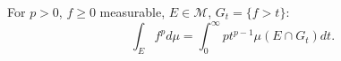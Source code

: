 For $p > 0$, $f \geq 0$ measurable, $E \in \mathcal{M}$, $G_t = \{f > t\}$:
$$\int_E f^p d\mu = \int_0^\infty p t^{p-1} \mu(E \cap G_t) dt.$$
